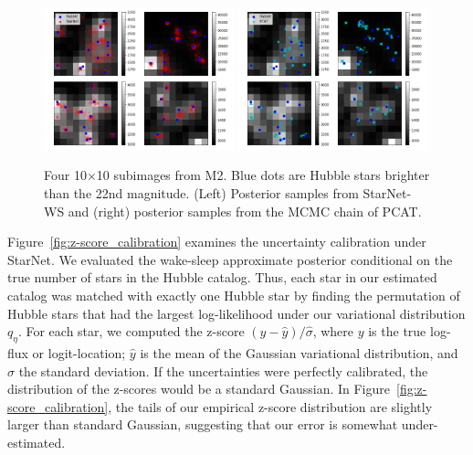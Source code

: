 \begin{figure}[H]
    \centering
    \includegraphics[width=0.49\textwidth]{figures/example_subimages_samples_ws.png}
    \includegraphics[width=0.49\textwidth]{figures/example_subimages_samples_pcat.png}
    \caption{Four 10$\times$10 subimages from
    M2. Blue dots are Hubble stars brighter than the 22nd magnitude. (Left) Posterior samples from StarNet-WS and (right) posterior samples from the MCMC chain of PCAT. }
    \label{fig:example_subimages_sampled}
\end{figure}

Figure~\ref{fig:z-score_calibration} examines the uncertainty calibration under StarNet. We evaluated the wake-sleep approximate posterior 
conditional on the true number of stars in the Hubble catalog. 
Thus, each star in our estimated catalog was matched with exactly one Hubble star
by finding the permutation of Hubble stars that had the largest log-likelihood under our variational distribution $q_\eta$. For each star, we computed the z-score $(y - \hat y) / \hat \sigma$, where $y$ is the true log-flux or 
logit-location; $\hat y$ is the mean of the Gaussian variational distribution, and $\hat\sigma$ the standard deviation.
If the uncertainties were perfectly calibrated, the distribution of the z-scores would be a standard Gaussian. 
In Figure~\ref{fig:z-score_calibration}, the tails of our empirical z-score distribution are slightly larger than standard Gaussian, suggesting that our error is somewhat under-estimated. 

